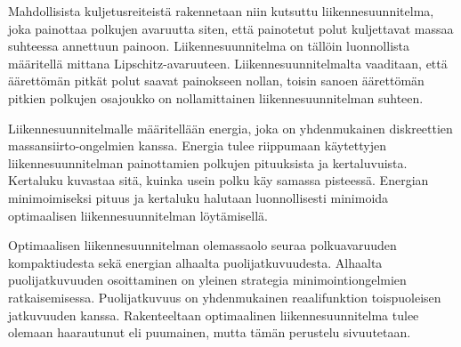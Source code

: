 Mahdollisista kuljetusreiteistä rakennetaan niin kutsuttu liikennesuunnitelma, joka painottaa polkujen avaruutta siten, että painotetut polut kuljettavat massaa suhteessa annettuun painoon. Liikennesuunnitelma on tällöin luonnollista määritellä mittana Lipschitz-avaruuteen. Liikennesuunnitelmalta vaaditaan, että äärettömän pitkät polut saavat painokseen nollan, toisin sanoen äärettömän pitkien polkujen osajoukko on nollamittainen liikennesuunnitelman suhteen.


Liikennesuunnitelmalle määritellään energia, joka on yhdenmukainen diskreettien massansiirto-ongelmien kanssa. Energia tulee riippumaan käytettyjen liikennesuunnitelman painottamien polkujen pituuksista ja kertaluvuista. Kertaluku kuvastaa sitä, kuinka usein polku käy samassa pisteessä. Energian minimoimiseksi pituus ja kertaluku halutaan luonnollisesti minimoida optimaalisen liikennesuunnitelman löytämisellä.

Optimaalisen liikennesuunnitelman olemassaolo seuraa polkuavaruuden kompaktiudesta sekä energian alhaalta puolijatkuvuudesta. Alhaalta puolijatkuvuuden osoittaminen on yleinen strategia minimointiongelmien ratkaisemisessa. Puolijatkuvuus on yhdenmukainen reaalifunktion toispuoleisen jatkuvuuden kanssa. Rakenteeltaan optimaalinen liikennesuunnitelma tulee olemaan haarautunut eli puumainen, mutta tämän perustelu sivuutetaan.






\newpage
\setcounter{tocdepth}{1}

\thispagestyle{empty}
\tableofcontents

\thispagestyle{empty}
\mainmatter


